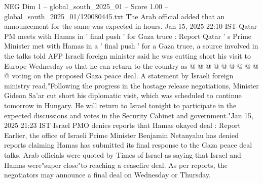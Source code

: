 \begin{textsample}{NEG Dim 1 – global\_south\_2025\_01 – Score 1.00 – global\_south\_2025\_01/120080445.txt}
The Arab official added that an announcement for the same was expected in hours.
Jan 15, 2025 22:10 IST Qatar PM meets with Hamas in ' final push ' for Gaza truce : Report Qatar ' s Prime Minister met with Hamas in a ' final push ' for a Gaza truce, a source involved in the talks told AFP Israeli foreign minister said he was cutting short his visit to Europe Wednesday so that he can return to the country as @ @ @ @ @ @ @ @ @ @ voting on the proposed Gaza peace deal.
A statement by Israeli foreign ministry read,"Following the progress in the hostage release negotiations, Minister Gideon Sa'ar cut short his diplomatic visit, which was scheduled to continue tomorrow in Hungary.
He will return to Israel tonight to participate in the expected discussions and votes in the Security Cabinet and government."Jan 15, 2025 21:23 IST Israel PMO denies reports that Hamas okayed deal : Report Earlier, the office of Israeli Prime Minister Benjamin Netanyahu has denied reports claiming Hamas has submitted its final response to the Gaza peace deal talks.
Arab officials were quoted by Times of Israel as saying that Israel and Hamas were"super close"to reaching a ceasefire deal.
As per reports, the negotiators may announce a final deal on Wednesday or Thursday.

\end{textsample}
